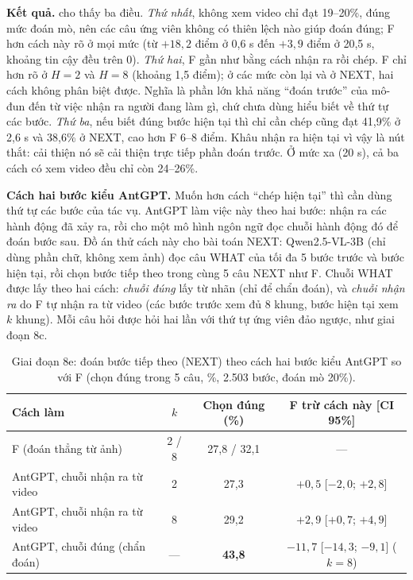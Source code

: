 \documentclass[a4paper,oneside]{report}
\begin{document}
\textbf{Kết quả.}  cho thấy ba điều. \textit{Thứ nhất}, không xem video chỉ đạt 19--20\%, đúng mức đoán mò, nên các câu ứng viên không có thiên lệch nào giúp đoán đúng; F hơn cách này rõ ở mọi mức (từ $+18{,}2$ điểm ở 0,6 s đến $+3{,}9$ điểm ở 20,5 s, khoảng tin cậy đều trên 0). \textit{Thứ hai}, F gần như bằng cách nhận ra rồi chép. F chỉ hơn rõ ở $H=2$ và $H=8$ (khoảng 1,5 điểm); ở các mức còn lại và ở NEXT, hai cách không phân biệt được. Nghĩa là phần lớn khả năng ``đoán trước'' của mô-đun đến từ việc nhận ra người đang làm gì, chứ chưa dùng hiểu biết về thứ tự các bước. \textit{Thứ ba}, nếu biết đúng bước hiện tại thì chỉ cần chép cũng đạt 41,9\% ở 2,6 s và 38,6\% ở NEXT, cao hơn F 6--8 điểm. Khâu nhận ra hiện tại vì vậy là nút thắt: cải thiện nó sẽ cải thiện trực tiếp phần đoán trước. Ở mức xa (20 s), cả ba cách có xem video đều chỉ còn 24--26\%.

\textbf{Cách hai bước kiểu AntGPT.} Muốn hơn cách ``chép hiện tại'' thì cần dùng thứ tự các bước của tác vụ. AntGPT \citep{zhao2024antgpt} làm việc này theo hai bước: nhận ra các hành động đã xảy ra, rồi cho một mô hình ngôn ngữ đọc chuỗi hành động đó để đoán bước sau. Đồ án thử cách này cho bài toán NEXT: Qwen2.5-VL-3B (chỉ dùng phần chữ, không xem ảnh) đọc câu WHAT của tối đa 5 bước trước và bước hiện tại, rồi chọn bước tiếp theo trong cùng 5 câu NEXT như F. Chuỗi WHAT được lấy theo hai cách: \textit{chuỗi đúng} lấy từ nhãn (chỉ để chẩn đoán), và \textit{chuỗi nhận ra} do F tự nhận ra từ video (các bước trước xem đủ 8 khung, bước hiện tại xem $k$ khung). Mỗi câu hỏi được hỏi hai lần với thứ tự ứng viên đảo ngược, như giai đoạn 8c.

\begin{table}[ht]
\centering
\caption{Giai đoạn 8e: đoán bước tiếp theo (NEXT) theo cách hai bước kiểu AntGPT so với F (chọn đúng trong 5 câu, \%, 2.503 bước, đoán mò 20\%).}
\label{tab:antgpt}
\small
\begin{tabular}{lccc}
\toprule
Cách làm & $k$ & Chọn đúng (\%) & F trừ cách này [CI 95\%] \\
\midrule
F (đoán thẳng từ ảnh) & 2 / 8 & 27,8 / 32,1 & --- \\
AntGPT, chuỗi nhận ra từ video & 2 & 27,3 & $+0{,}5$ [$-2{,}0$; $+2{,}8$] \\
AntGPT, chuỗi nhận ra từ video & 8 & 29,2 & $+2{,}9$ [$+0{,}7$; $+4{,}9$] \\
AntGPT, chuỗi đúng (chẩn đoán) & --- & \textbf{43,8} & $-11{,}7$ [$-14{,}3$; $-9{,}1$] ($k=8$) \\
\bottomrule
\end{tabular}
\end{table}
\end{document}
